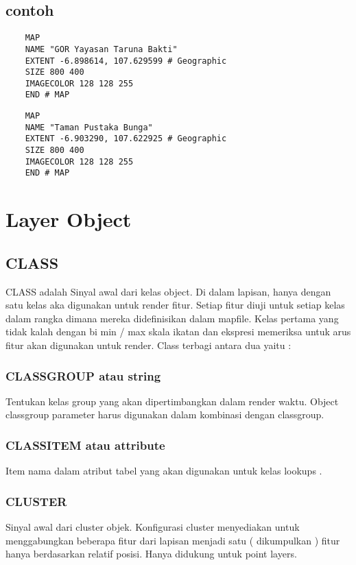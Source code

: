 \subsection{contoh}
	\begin{verbatim}
	MAP
  	NAME "GOR Yayasan Taruna Bakti"
  	EXTENT -6.898614, 107.629599 # Geographic
  	SIZE 800 400
  	IMAGECOLOR 128 128 255
	END # MAP
	\end{verbatim}

	\begin{verbatim}
	MAP
  	NAME "Taman Pustaka Bunga"
  	EXTENT -6.903290, 107.622925 # Geographic
  	SIZE 800 400
  	IMAGECOLOR 128 128 255
	END # MAP
	\end{verbatim}
\section{Layer Object}

\subsection{CLASS}
CLASS adalah Sinyal awal dari kelas object. Di dalam lapisan, hanya dengan satu kelas aka digunakan untuk render fitur.  
Setiap fitur diuji untuk setiap kelas dalam rangka dimana mereka didefinisikan dalam mapfile.  
Kelas pertama yang tidak kalah dengan bi min / max skala ikatan dan ekspresi memeriksa untuk arus fitur akan digunakan untuk render.  
Class terbagi antara dua yaitu :

  \subsubsection{CLASSGROUP atau string}
  Tentukan kelas group yang akan dipertimbangkan dalam render waktu. Object classgroup parameter harus digunakan dalam kombinasi dengan classgroup.
  \subsubsection{CLASSITEM atau attribute}
  Item nama dalam atribut tabel yang akan digunakan untuk kelas lookups .
  \subsubsection{CLUSTER}
  Sinyal awal dari cluster objek. Konfigurasi cluster menyediakan untuk menggabungkan beberapa fitur dari lapisan menjadi satu ( dikumpulkan ) fitur  hanya berdasarkan relatif posisi. Hanya didukung untuk point layers.
